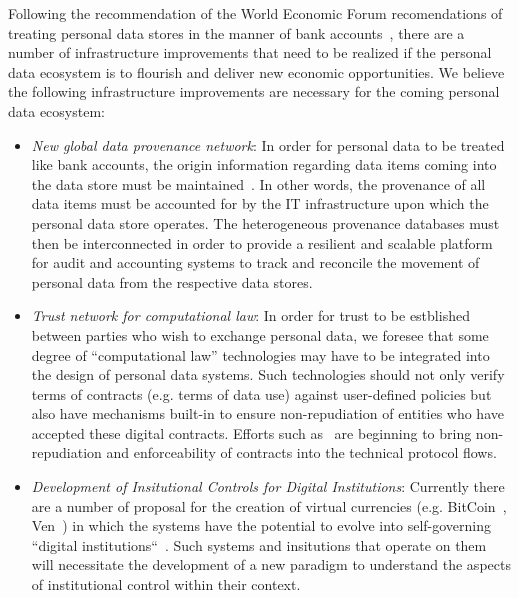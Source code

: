 Following the recommendation of the World Economic Forum recomendations of treating personal data stores in the manner
of bank accounts~\cite{WEF2011}, there are a number of infrastructure improvements that need
to be realized if the personal data ecosystem is to flourish and deliver new economic opportunities.
We believe the following infrastructure improvements are necessary for the coming personal data ecosystem:
\begin{itemize}
\item  {\em New global data provenance network}:  In order for personal data to be treated
like bank accounts, the origin information regarding data items coming into the data store
must be maintained~\cite{HardjonoGreenwood2013}. 
In other words, the provenance of all data items must be
accounted for by the IT infrastructure upon which the personal data store operates.
The heterogeneous provenance databases must then be interconnected in order
to provide a resilient and scalable platform for audit and accounting systems
to track and reconcile the movement of personal data from the respective data stores.

\item  {\em Trust network for computational law}: In order for trust to be estblished between
parties who wish to exchange personal data, we foresee that some degree of ``computational law''
technologies may have to be integrated into the design of personal data systems.
Such technologies should not only verify terms of contracts (e.g. terms of data use) against user-defined policies
but also have mechanisms built-in to ensure non-repudiation of entities
who have accepted these digital contracts.
Efforts such as~\cite{UMAcore,UMABindingObligations} are beginning to bring non-repudiation and enforceability of contracts
into the technical protocol flows.

\item  {\em Development of Insitutional Controls for Digital Institutions}:
Currently there are a number of proposal for the creation of virtual currencies (e.g. BitCoin~\cite{BarberBoyen2012}, Ven~\cite{Stalnaker2013})
in which the systems have the potential to evolve into self-governing ``digital institutions``~\cite{HardjonoDeegan2014}.
Such systems and insitutions that operate on them will necessitate the development of a new paradigm
to understand the aspects of institutional control within their context.


\end{itemize}




